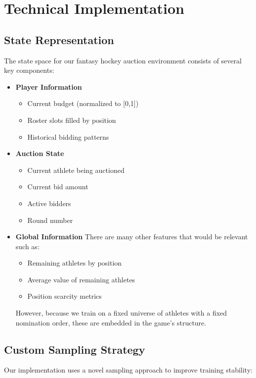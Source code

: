 \documentclass[11pt]{article}
\begin{document}
\section{Technical Implementation}
\subsection{State Representation}
The state space for our fantasy hockey auction environment consists of several key components:

\begin{itemize}
    \item \textbf{Player Information}
    \begin{itemize}
        \item Current budget (normalized to [0,1])
        \item Roster slots filled by position
        \item Historical bidding patterns
    \end{itemize}
    
    \item \textbf{Auction State}
    \begin{itemize}
        \item Current athlete being auctioned
        \item Current bid amount
        \item Active bidders
        \item Round number
    \end{itemize}
    
    \item \textbf{Global Information}
    There are many other features that would be relevant such as:
    \begin{itemize}
        \item Remaining athletes by position
        \item Average value of remaining athletes
        \item Position scarcity metrics
    \end{itemize}

    However, because we train on a fixed universe of athletes with a fixed nomination order, these are embedded in the game's structure.
\end{itemize}

\subsection{Custom Sampling Strategy}
Our implementation uses a novel sampling approach to improve training stability:
\end{document}
